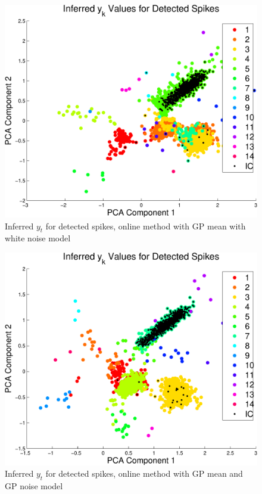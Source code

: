 \documentclass{article} %
\begin{document}
\begin{figure}
\includegraphics[width=\textwidth]{ykarwn}
\caption{Inferred $y_t$ for detected spikes, online method with GP mean with white noise model}
\end{figure}
\begin{figure}
\includegraphics[width=\textwidth]{ykar}
\caption{Inferred $y_t$ for detected spikes, online method with GP mean and  GP noise model}
\end{figure}
\end{document}
